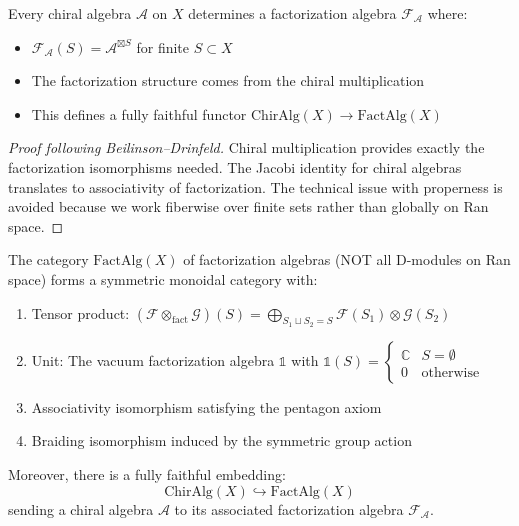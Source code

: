 \begin{theorem}\label{thm:chiral-as-fact}
Every chiral algebra $\mathcal{A}$ on $X$ determines a factorization algebra $\mathcal{F}_\mathcal{A}$ where:
\begin{itemize}
\item $\mathcal{F}_\mathcal{A}(S) = \mathcal{A}^{\boxtimes S}$ for finite $S \subset X$
\item The factorization structure comes from the chiral multiplication
\item This defines a fully faithful functor $\text{ChirAlg}(X) \to \text{FactAlg}(X)$
\end{itemize}
\end{theorem}

\begin{proof}[Proof following Beilinson--Drinfeld]
Chiral multiplication provides exactly the factorization isomorphisms needed.
The Jacobi identity for chiral algebras translates to associativity of factorization. The technical 
issue with properness is avoided because we work fiberwise over finite sets rather than globally on Ran space.
\end{proof}


\begin{theorem}\label{thm:fact-monoidal-corrected}
The category $\text{FactAlg}(X)$ of factorization algebras (NOT all D-modules on Ran space) forms a symmetric monoidal 
category with:
\begin{enumerate}
\item Tensor product: $(\mathcal{F} \otimes_{\text{fact}} \mathcal{G})(S) = \bigoplus_{S_1 \sqcup S_2 = S} \mathcal{F}(S_1) \otimes \mathcal{G}(S_2)$
\item Unit: The vacuum factorization algebra $\mathbb{1}$ with $\mathbb{1}(S) = \begin{cases} \mathbb{C} & S = \emptyset \\ 0 & \text{otherwise} \end{cases}$
\item Associativity isomorphism satisfying the pentagon axiom
\item Braiding isomorphism induced by the symmetric group action
\end{enumerate}

Moreover, there is a fully faithful embedding:
\[\text{ChirAlg}(X) \hookrightarrow \text{FactAlg}(X)\]
sending a chiral algebra $\mathcal{A}$ to its associated factorization algebra $\mathcal{F}_{\mathcal{A}}$.
\end{theorem}

